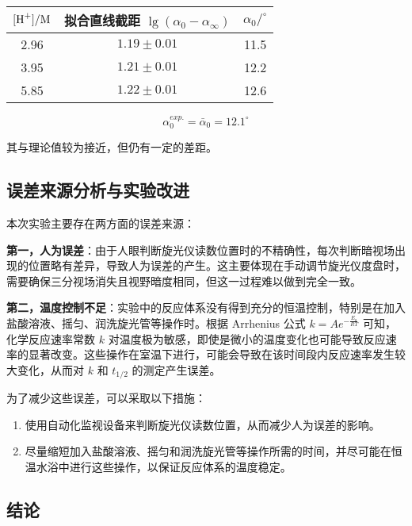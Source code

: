 \begin{table}[H]
    \centering
    \begin{tabular}{ccc}
        \toprule
        $[\ce{H+}] / \si{M}$ & 拟合直线截距 $\lg \left(\alpha_0-\alpha_{\infty}\right)$ & $\alpha_0 /^{\circ}$ \\
        \midrule
        2.96 & $1.19 \pm 0.01$ & 11.5 \\
        3.95 & $1.21 \pm 0.01$ & 12.2 \\
        5.85 & $1.22 \pm 0.01$ & 12.6 \\
        \bottomrule
    \end{tabular}
    
    \label{tab:7}
\end{table}

$$
\alpha_0^{exp.}=\bar{\alpha}_0=12.1^{\circ}
$$

其与理论值较为接近，但仍有一定的差距。

\subsection{误差来源分析与实验改进}

本次实验主要存在两方面的误差来源：

\textbf{第一，人为误差}：由于人眼判断旋光仪读数位置时的不精确性，每次判断暗视场出现的位置略有差异，导致人为误差的产生。这主要体现在手动调节旋光仪度盘时，需要确保三分视场消失且视野暗度相同，但这一过程难以做到完全一致。

\textbf{第二，温度控制不足}：实验中的反应体系没有得到充分的恒温控制，特别是在加入盐酸溶液、摇匀、润洗旋光管等操作时。根据 Arrhenius 公式 $k = A e^{-\frac{E_a}{R T}}$ 可知，化学反应速率常数 $k$ 对温度极为敏感，即使是微小的温度变化也可能导致反应速率的显著改变。这些操作在室温下进行，可能会导致在该时间段内反应速率发生较大变化，从而对 $k$ 和 $t_{1 / 2}$ 的测定产生误差。

为了减少这些误差，可以采取以下措施：

\begin{enumerate}
    \item 使用自动化监视设备来判断旋光仪读数位置，从而减少人为误差的影响。
    \item 尽量缩短加入盐酸溶液、摇匀和润洗旋光管等操作所需的时间，并尽可能在恒温水浴中进行这些操作，以保证反应体系的温度稳定。
\end{enumerate}

\subsection{结论}

